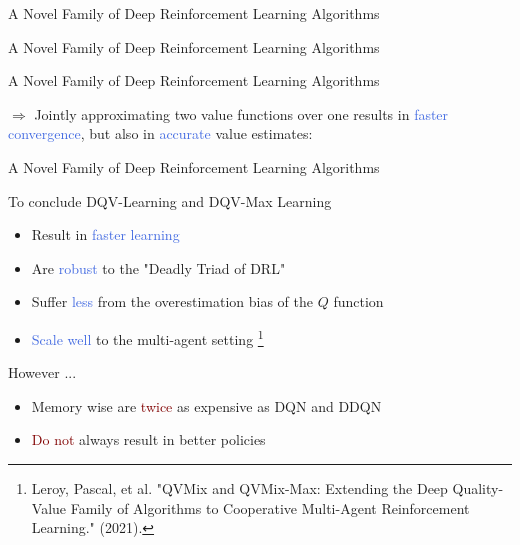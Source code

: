 \documentclass{beamer}
\begin{document}
\begin{frame}{A Novel Family of Deep Reinforcement Learning Algorithms}
	
\end{frame}

\begin{frame}{A Novel Family of Deep Reinforcement Learning Algorithms}
	
\end{frame}

\begin{frame}{A Novel Family of Deep Reinforcement Learning Algorithms}

	$\Rightarrow$ Jointly approximating two value functions over one results in \textcolor{RoyalBlue}{faster convergence}, but also in \textcolor{RoyalBlue}{accurate} value estimates:

	

\end{frame}

\begin{frame}{A Novel Family of Deep Reinforcement Learning Algorithms}

	To conclude DQV-Learning and DQV-Max Learning

	\begin{itemize}
		\item Result in \textcolor{RoyalBlue}{faster learning}
		\item Are \textcolor{RoyalBlue}{robust} to the "Deadly Triad of DRL"
		\item Suffer \textcolor{RoyalBlue}{less} from the overestimation bias of the $Q$ function 
		\item \textcolor{RoyalBlue}{Scale well} to the multi-agent setting \footnote{Leroy, Pascal, et al. "QVMix and QVMix-Max: Extending the Deep Quality-Value Family of Algorithms to Cooperative Multi-Agent Reinforcement Learning." (2021).}
	\end{itemize}

	However ... 

	\begin{itemize}
		\item Memory wise are \textcolor{Maroon}{twice} as expensive as DQN and DDQN
		\item \textcolor{Maroon}{Do not} always result in better policies
	\end{itemize}

\end{frame}
\end{document}
